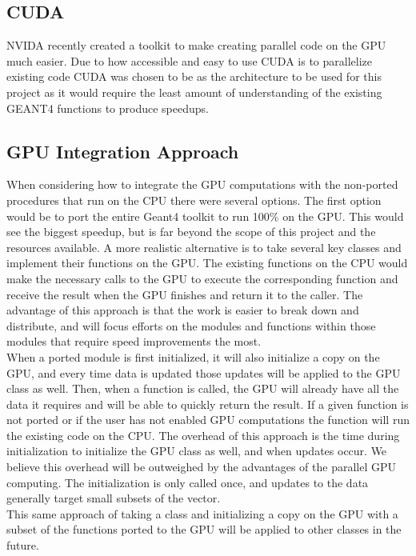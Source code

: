 \documentclass[12pt]{article}
\begin{document}
\subsection{CUDA}
NVIDA recently created a toolkit to make creating parallel code on the GPU much easier. Due to how accessible and easy to use CUDA is to parallelize existing code CUDA was chosen to be as the architecture to be used for this project as it would require the least amount of understanding of the existing GEANT4 functions to produce speedups. 

\subsection{GPU Integration Approach} %
When considering how to integrate the GPU computations with the non-ported procedures that run on the CPU there were several options. The first option would be to port the entire Geant4 toolkit to run 100\% on the GPU. This would see the biggest speedup, but is far beyond the scope of this project and the resources available. A more realistic alternative is to take several key classes and implement their functions on the GPU. The existing functions on the CPU would make the necessary calls to the GPU to execute the corresponding function and receive the result when the GPU finishes and return it to the caller. The advantage of this approach is that the work is easier to break down and distribute, and will focus efforts on the modules and functions within those modules that require speed improvements the most.\\

When a ported module is first initialized, it will also initialize a copy on the GPU, and every time data is updated those updates will be applied to the GPU class as well. Then, when a function is called, the GPU will already have all the data it requires and will be able to quickly return the result. If a given function is not ported or if the user has not enabled GPU computations the function will run the existing code on the CPU. The overhead of this approach is the time during initialization to initialize the GPU class as well, and when updates occur. We believe this overhead will be outweighed by the advantages of the parallel GPU computing. The initialization is only called once, and updates to the data generally target small subsets of the vector.\\

This same approach of taking a class and initializing a copy on the GPU with a subset of the functions ported to the GPU will be applied to other classes in the future.
\end{document}
